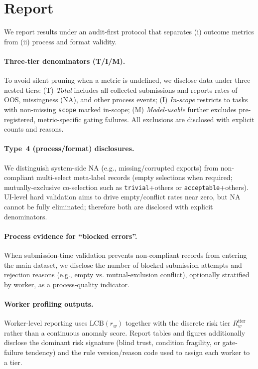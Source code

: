 \section{Report}
\label{sec:report}

We report results under an audit-first protocol that separates (i) outcome metrics from (ii) process and
format validity.

\paragraph{Three-tier denominators (T/I/M).}
To avoid silent pruning when a metric is undefined, we disclose data under three nested tiers:
(T) \emph{Total} includes all collected submissions and reports rates of OOS, missingness (NA), and other
process events; (I) \emph{In-scope} restricts to tasks with non-missing \texttt{scope} marked in-scope;
(M) \emph{Model-usable} further excludes pre-registered, metric-specific gating failures.
All exclusions are disclosed with explicit counts and reasons.

\paragraph{Type~4 (process/format) disclosures.}
We distinguish system-side NA (e.g., missing/corrupted exports) from non-compliant multi-select meta-label
records (empty selections when required; mutually-exclusive co-selection such as \texttt{trivial}+others or
\texttt{acceptable}+others). UI-level hard validation aims to drive empty/conflict rates near zero, but NA
cannot be fully eliminated; therefore both are disclosed with explicit denominators.

\paragraph{Process evidence for ``blocked errors''.}
When submission-time validation prevents non-compliant records from entering the main dataset, we disclose
the number of blocked submission attempts and rejection reasons (e.g., empty vs. mutual-exclusion conflict),
optionally stratified by worker, as a process-quality indicator.

\paragraph{Worker profiling outputs.}
Worker-level reporting uses $\mathrm{LCB}(r_w)$ together with the discrete risk tier $R_w^{\mathrm{tier}}$ rather
than a continuous anomaly score. Report tables and figures additionally disclose the dominant risk signature
(blind trust, condition fragility, or gate-failure tendency) and the rule version/reason code used to assign
each worker to a tier.
